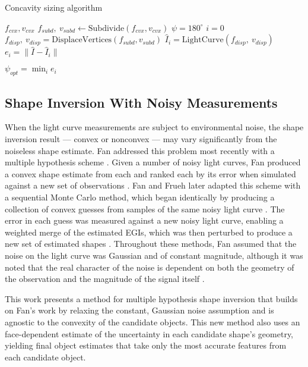 \begin{algorithm}
  \caption{Concavity sizing algorithm}\label{alg:concavity_iter}
  \begin{algorithmic}
    \State $f_{cvx},v_{cvx}$ 
    \State $f_{subd}, \:v_{subd} \gets \mathrm{Subdivide}(f_{cvx},v_{cvx})$ 
    \State $\psi = 180^\circ$ 
    \State $i = 0$ 
      \State $f_{disp}, \:v_{disp} = \mathrm{DisplaceVertices}(f_{subd},v_{subd})$
      \State $\hat{I}_{i} = \mathrm{LightCurve}(f_{disp}, \:v_{disp})$
      \State $e_i = \| \hat{I} - \hat{I}_{i} \|$
      \State{$\psi \gets \psi + \Delta \psi$}
    \EndWhile

    $\psi_{opt} = \min_i{e_i}$
  \end{algorithmic}
\end{algorithm}

\subsection{Shape Inversion With Noisy Measurements}

When the light curve measurements are subject to environmental noise, the shape inversion result --- convex or nonconvex --- may vary significantly from the noiseless shape estimate. Fan addressed this problem most recently with a multiple hypothesis scheme \cite{fan2020thesis}. Given a number of noisy light curves, Fan produced a convex shape estimate from each and ranked each by its error when simulated against a new set of observations \cite{fan2020thesis}. Fan and Frueh later adapted this scheme with a sequential Monte Carlo method, which began identically by producing a collection of convex guesses from samples of the same noisy light curve \cite{fan20201}. The error in each guess was measured against a new noisy light curve, enabling a weighted merge of the estimated EGIs, which was then perturbed to produce a new set of estimated shapes \cite{fan2021}. Throughout these methods, Fan assumed that the noise on the light curve was Gaussian and of constant magnitude, although it was noted that the real character of the noise is dependent on both the geometry of the observation and the magnitude of the signal itself \cite{fan2020thesis}. 

This work presents a method for multiple hypothesis shape inversion that builds on Fan's work by relaxing the constant, Gaussian noise assumption and is agnostic to the convexity of the candidate objects. This new method also uses an face-dependent estimate of the uncertainty in each candidate shape's geometry, yielding final object estimates that take only the most accurate features from each candidate object.

